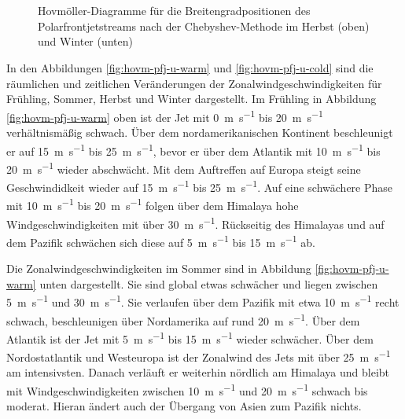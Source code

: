 \begin{figure}
  \centering
  \begin{minipage}{\textwidth}
    \centering
  \end{minipage} \\ 
    \begin{minipage}{\textwidth}
      \centering
  \end{minipage} \\ 
  \caption[Hovmöllerdiagramme der Positionen des Polarfrontjets nach Chebyshev im Herbst und Winter]{Hovmöller-Diagramme für die Breitengradpositionen des Polarfrontjetstreams nach der Chebyshev-Methode im Herbst (oben) und Winter (unten)} \label{fig:hovm-pfj-lat-cold}
\end{figure}

In den Abbildungen \ref{fig:hovm-pfj-u-warm} und \ref{fig:hovm-pfj-u-cold} sind die räumlichen und zeitlichen Veränderungen der Zonalwindgeschwindigkeiten für Frühling, Sommer, Herbst und Winter dargestellt. Im Frühling in Abbildung \ref{fig:hovm-pfj-u-warm} oben ist der Jet mit \SI{0}{\metre\per\second} bis \SI{20}{\metre\per\second} verhältnismäßig schwach. Über dem nordamerikanischen Kontinent beschleunigt er auf \SI{15}{\metre\per\second} bis \SI{25}{\metre\per\second}, bevor er über dem Atlantik mit \SI{10}{\metre\per\second} bis \SI{20}{\metre\per\second} wieder abschwächt. Mit dem Auftreffen auf Europa steigt seine Geschwindidkeit wieder auf \SI{15}{\metre\per\second} bis \SI{25}{\metre\per\second}. Auf eine schwächere Phase mit \SI{10}{\metre\per\second} bis \SI{20}{\metre\per\second} folgen über dem Himalaya hohe Windgeschwindigkeiten mit über \SI{30}{\metre\per\second}. Rückseitig des Himalayas und auf dem Pazifik schwächen sich diese auf \SI{5}{\metre\per\second} bis \SI{15}{\metre\per\second} ab.

Die Zonalwindgeschwindigkeiten im Sommer sind in Abbildung \ref{fig:hovm-pfj-u-warm} unten dargestellt. Sie sind global etwas schwächer und liegen zwischen \SI{5}{\metre\per\second} und \SI{30}{\metre\per\second}. Sie verlaufen über dem Pazifik mit etwa \SI{10}{\metre\per\second} recht schwach, beschleunigen über Nordamerika auf rund \SI{20}{\metre\per\second}. Über dem Atlantik ist der Jet mit \SI{5}{\metre\per\second} bis \SI{15}{\metre\per\second} wieder schwächer. Über dem Nordostatlantik und Westeuropa ist der Zonalwind des Jets mit über \SI{25}{\metre\per\second} am intensivsten. Danach verläuft er weiterhin nördlich am Himalaya und bleibt mit Windgeschwindigkeiten zwischen \SI{10}{\metre\per\second} und \SI{20}{\metre\per\second} schwach bis moderat. Hieran ändert auch der Übergang von Asien zum Pazifik nichts.

